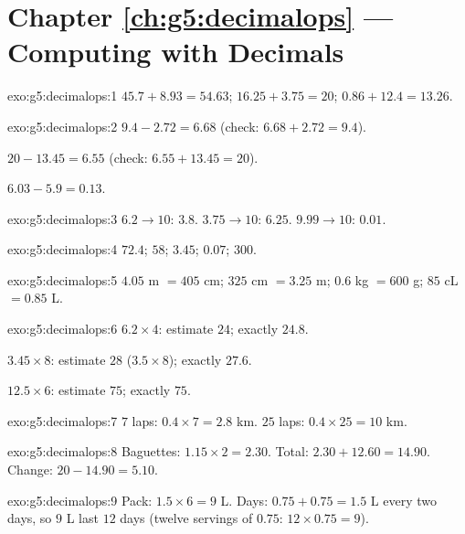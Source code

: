 \section*{Chapter \ref{ch:g5:decimalops} --- Computing with Decimals}

\begin{solution}{exo:g5:decimalops:1}
$45.7 + 8.93 = 54.63$; \quad
$16.25 + 3.75 = 20$; \quad
$0.86 + 12.4 = 13.26$.
\end{solution}

\begin{solution}{exo:g5:decimalops:2}
$9.4 - 2.72 = 6.68$ (check: $6.68 + 2.72 = 9.4$).

$20 - 13.45 = 6.55$ (check: $6.55 + 13.45 = 20$).

$6.03 - 5.9 = 0.13$.
\end{solution}

\begin{solution}{exo:g5:decimalops:3}
$6.2 \to 10$: $3.8$. \quad $3.75 \to 10$: $6.25$. \quad
$9.99 \to 10$: $0.01$.
\end{solution}

\begin{solution}{exo:g5:decimalops:4}
$72.4$; \quad $58$; \quad $3.45$; \quad $0.07$; \quad $300$.
\end{solution}

\begin{solution}{exo:g5:decimalops:5}
$4.05$ m $= 405$ cm; \quad $325$ cm $= 3.25$ m; \quad
$0.6$ kg $= 600$ g; \quad $85$ cL $= 0.85$ L.
\end{solution}

\begin{solution}{exo:g5:decimalops:6}
$6.2 \times 4$: estimate $24$; exactly $24.8$.

$3.45 \times 8$: estimate $28$ ($3.5 \times 8$); exactly $27.6$.

$12.5 \times 6$: estimate $75$; exactly $75$.
\end{solution}

\begin{solution}{exo:g5:decimalops:7}
$7$ laps: $0.4 \times 7 = 2.8$ km. $25$ laps:
$0.4 \times 25 = 10$ km.
\end{solution}

\begin{solution}{exo:g5:decimalops:8}
Baguettes: $1.15 \times 2 = 2.30$. Total: $2.30 + 12.60 = 14.90$.
Change: $20 - 14.90 = 5.10$.
\end{solution}

\begin{solution}{exo:g5:decimalops:9}
Pack: $1.5 \times 6 = 9$ L. Days: $0.75 + 0.75 = 1.5$ L every two
days, so $9$ L last $12$ days (twelve servings of $0.75$:
$12 \times 0.75 = 9$).
\end{solution}

